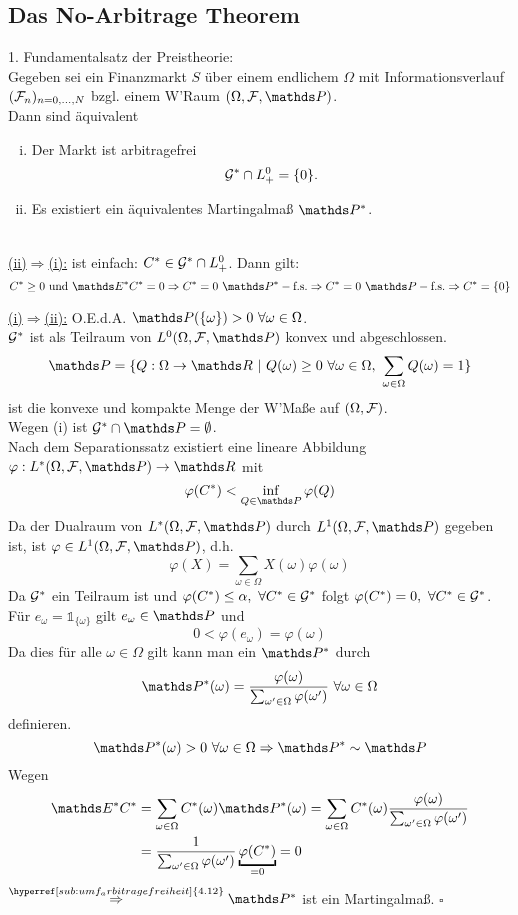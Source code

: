 \subsection{Das No-Arbitrage Theorem}
\label{sub:no-arbitrage_theorem}
1. Fundamentalsatz der Preistheorie:\\
Gegeben sei ein Finanzmarkt $S$ über einem endlichem $\Omega$ mit Informationsverlauf $(\mathcal{F}_n)_{n=0,\dots,N}$ bzgl. einem W'Raum $(\Omega,\F,\Pw)$.\\
Dann sind äquivalent
\begin{enumerate}[(i)]
	\item Der Markt ist arbitragefrei
	\[
	\mathcal{G}^*\cap L_+^0=\{0\}.
	\]
	\item Es existiert ein äquivalentes Martingalmaß $\Pw^*$.
\end{enumerate}

\\
\uline{(ii)$\Rightarrow$(i):}
ist einfach: $C^*\in\mathcal{G}^*\cap L_+^0$.
Dann gilt:
\[
C^*\ge 0\text{ und } \E^*C^*=0\Rightarrow C^*=0~ \Pfs[*]\Rightarrow C^*=0~ \Pfs \Rightarrow C^*=\{0\}
\]

\uline{(i)$\Rightarrow$(ii):}
O.E.d.A. $\Pw(\{\omega\})>0~\forall \omega\in \Omega$.\\
$\mathcal{G}^*$ ist als Teilraum von $L^0(\Omega,\F,\Pw)$ konvex und abgeschlossen.
\[
\Pw=\{Q:\Omega\to \R~|~Q(\omega)\ge 0~\forall \omega\in \Omega,~\sum_{\omega\in \Omega}Q(\omega)=1 \}
\]
ist die konvexe und kompakte Menge der W'Maße auf $(\Omega,\mathcal{F})$.\\
Wegen (i) ist $\G^*\cap\Pw=\emptyset$.\\
Nach dem Separationssatz existiert eine lineare Abbildung $\varphi:L^*(\Omega,\F,\Pw)\to \R$ mit
\[
\varphi(C^*)<\inf\limits_{Q\in \Pw}\varphi(Q)
\]
Da der Dualraum von $L^*(\Omega,\F,\Pw)$ durch $L^1(\Omega,\F,\Pw)$ gegeben ist, ist $\varphi\in L^1(\Omega,\F,\Pw)$, d.h.
\[
\varphi(X)=\sum_{\omega\in \Omega} X(\omega)\varphi(\omega)
\]
Da $\mathcal{G}^*$ ein Teilraum ist und $\varphi(C^*)\le \alpha,~\forall C^*\in \mathcal{G}^*$ folgt $\varphi(C^*)=0,~\forall C^*\in \mathcal{G}^*$.\\
Für $e_\omega=\mathbb{1}_{\{\omega\}}$ gilt $e_\omega\in \Pw$ und
\[
0<\varphi(e_\omega)=\varphi(\omega)
\]
Da dies für alle $\omega\in\Omega$ gilt kann man ein $\Pw^*$ durch
\[
\Pw^*(\omega)=\frac{\varphi(\omega)}{\sum_{\omega'\in\Omega}\varphi(\omega')}~\forall \omega\in\Omega
\]
definieren.
\[
\Pw^*(\omega)>0~\forall \omega\in\Omega \Rightarrow \Pw^*\sim \Pw
\]
Wegen
\begin{equation*}
\begin{aligned}
\E^*C^* &= \sum_{\omega\in\Omega}C^*(\omega)\Pw^*(\omega) = \sum_{\omega\in \Omega}C^*(\omega)\frac{\varphi(\omega)}{\sum_{\omega'\in\Omega}\varphi(\omega')}\\
&= \frac{1}{\sum_{\omega'\in\Omega}\varphi(\omega')}\underbracket{\varphi(C^*)}_{=0}=0
\end{aligned}
\end{equation*}
$\stackrel{\hyperref[sub:umf_arbitragefreiheit]{4.12}}{\Rightarrow} \Pw^*$ ist ein Martingalmaß.
\hfill $\square$

